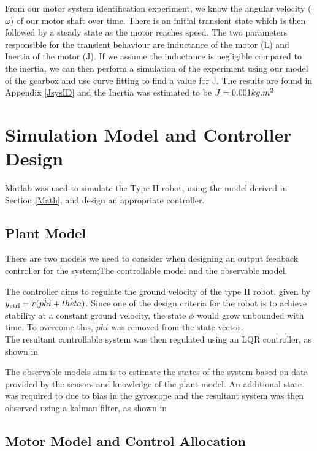 \documentclass{UoNMCHA}
\numberwithin{equation}{section}
\begin{document}
From our motor system identification experiment, we know the angular velocity ($\omega$) of our motor shaft over time. There is an initial transient state which is then followed by a steady state as the motor reaches speed. The two parameters responsible for the transient behaviour are inductance of the motor (L) and Inertia of the motor (J). If we assume the inductance is negligible compared to the inertia, we can then perform a simulation of the experiment using our model of the gearbox and use curve fitting to find a value for J. The results are found in Appendix \ref{JsysID} and the Inertia was estimated to be $J =  0.001 kg.m\textsuperscript{2}$


\newpage
\section{Simulation Model and Controller Design}\label{Simulation}

	
Matlab was used to simulate the Type II robot, using the model derived in Section \ref{Math}, and design an appropriate controller.

\subsection{Plant Model}

There are two models we need to consider when designing an output feedback controller for the system;The controllable model and the observable model.

The controller aims to regulate the ground velocity of the type II robot, given by $y\textsubscript{ctrl} = r(\dot{phi} + \dot{theta})$. Since one of the design criteria for the robot is to achieve stability at a constant ground velocity, the state $\phi$ would grow unbounded with time. To overcome this, $phi$ was removed from the state vector.\\
The resultant controllable system was then regulated using an LQR controller, as shown in \citep{Franklin}

The observable models aim is to estimate the states of the system based on data provided by the sensors and knowledge of the plant model. An additional state was required to due to bias in the gyroscope and the resultant system was then observed using a kalman filter, as shown in \citep{Franklin}

\subsection{Motor Model and Control Allocation}
\end{document}

